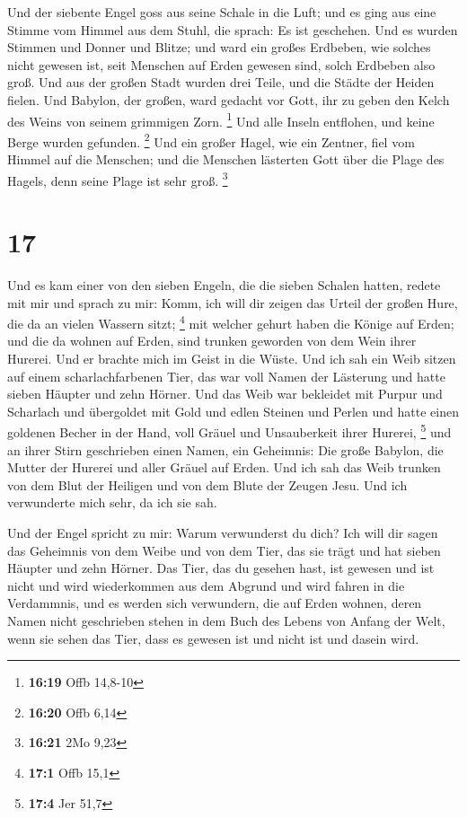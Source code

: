  Und der siebente Engel goss aus seine Schale in die Luft;
und es ging aus eine Stimme vom Himmel aus dem Stuhl, die sprach: Es ist
geschehen.  Und es wurden Stimmen und Donner und Blitze;
und ward ein großes Erdbeben, wie solches nicht gewesen ist, seit
Menschen auf Erden gewesen sind, solch Erdbeben also groß. 
Und aus der großen Stadt wurden drei Teile, und die Städte der Heiden
fielen. Und Babylon, der großen, ward gedacht vor Gott, ihr zu geben den
Kelch des Weins von seinem grimmigen Zorn. \footnote{\textbf{16:19} Offb
  14,8-10}  Und alle Inseln entflohen, und keine Berge
wurden gefunden. \footnote{\textbf{16:20} Offb 6,14}  Und
ein großer Hagel, wie ein Zentner, fiel vom Himmel auf die Menschen; und
die Menschen lästerten Gott über die Plage des Hagels, denn seine Plage
ist sehr groß. \footnote{\textbf{16:21} 2Mo 9,23}

\hypertarget{section-6}{%
\section{17}\label{section-6}}

 Und es kam einer von den sieben Engeln, die die sieben
Schalen hatten, redete mit mir und sprach zu mir: Komm, ich will dir
zeigen das Urteil der großen Hure, die da an vielen Wassern sitzt;
\footnote{\textbf{17:1} Offb 15,1}  mit welcher gehurt haben
die Könige auf Erden; und die da wohnen auf Erden, sind trunken geworden
von dem Wein ihrer Hurerei.  Und er brachte mich im Geist in
die Wüste. Und ich sah ein Weib sitzen auf einem scharlachfarbenen Tier,
das war voll Namen der Lästerung und hatte sieben Häupter und zehn
Hörner.  Und das Weib war bekleidet mit Purpur und Scharlach
und übergoldet mit Gold und edlen Steinen und Perlen und hatte einen
goldenen Becher in der Hand, voll Gräuel und Unsauberkeit ihrer Hurerei,
\footnote{\textbf{17:4} Jer 51,7}  und an ihrer Stirn
geschrieben einen Namen, ein Geheimnis: Die große Babylon, die Mutter
der Hurerei und aller Gräuel auf Erden.  Und ich sah das
Weib trunken von dem Blut der Heiligen und von dem Blute der Zeugen
Jesu. Und ich verwunderte mich sehr, da ich sie sah.

 Und der Engel spricht zu mir: Warum verwunderst du dich?
Ich will dir sagen das Geheimnis von dem Weibe und von dem Tier, das sie
trägt und hat sieben Häupter und zehn Hörner.  Das Tier, das
du gesehen hast, ist gewesen und ist nicht und wird wiederkommen aus dem
Abgrund und wird fahren in die Verdammnis, und es werden sich
verwundern, die auf Erden wohnen, deren Namen nicht geschrieben stehen
in dem Buch des Lebens von Anfang der Welt, wenn sie sehen das Tier,
dass es gewesen ist und nicht ist und dasein wird.

